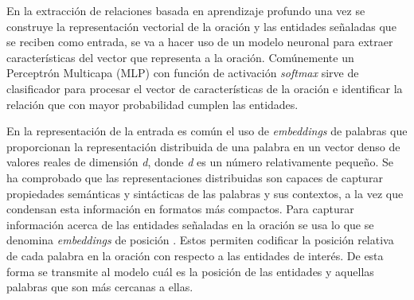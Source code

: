 
En la extracción de relaciones basada en aprendizaje profundo una vez se construye la representación vectorial de la oración y las entidades señaladas que se reciben como entrada, se va a hacer uso de un modelo neuronal para extraer características del vector que representa a la oración. Comúnemente un Perceptrón Multicapa (MLP) con función de activación \textit{softmax} sirve de clasificador para procesar el vector de características de la oración e identificar la relación que con mayor probabilidad cumplen las entidades.




En la representación de la entrada es común el uso  de \textit{embeddings} de palabras \cite{turian2010word, mikolov2013distributed} que proporcionan la representación distribuida de una palabra en un vector denso de valores reales de dimensión  \textit{d}, donde \textit{d} es un número relativamente pequeño.  Se ha comprobado que las representaciones distribuidas son capaces de capturar propiedades semánticas y sintácticas de las palabras y sus contextos, a la vez que condensan esta información en formatos más compactos\cite{nguyen2015relation, santos2015classifying, zhang2015classificationRNN, zhou2016attention}. Para capturar información acerca de las entidades señaladas en la oración se usa lo que se denomina \textit{embeddings} de posición \cite{zeng2014relation}. Estos permiten codificar la posición relativa de cada palabra en la oración con respecto a las entidades de interés. De esta forma se transmite al modelo cuál es la posición de las entidades y aquellas palabras que son más cercanas a ellas.


